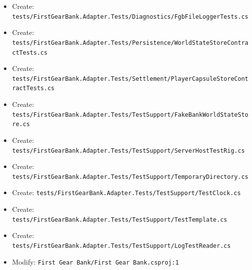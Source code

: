 \documentclass[
  10pt,
  letterpaper,
]{article}
\begin{document}
\begin{itemize}
\item
  Create:
  \texttt{tests/}\allowbreak{}\texttt{FirstGearBank.}\allowbreak{}\texttt{Adapter.}\allowbreak{}\texttt{Tests/}\allowbreak{}\texttt{Diagnostics/}\allowbreak{}\texttt{FgbFileLoggerTests.}\allowbreak{}\texttt{cs}
\item
  Create:
  \texttt{tests/}\allowbreak{}\texttt{FirstGearBank.}\allowbreak{}\texttt{Adapter.}\allowbreak{}\texttt{Tests/}\allowbreak{}\texttt{Persistence/}\allowbreak{}\texttt{WorldStateStoreContractTests.}\allowbreak{}\texttt{cs}
\item
  Create:
  \texttt{tests/}\allowbreak{}\texttt{FirstGearBank.}\allowbreak{}\texttt{Adapter.}\allowbreak{}\texttt{Tests/}\allowbreak{}\texttt{Settlement/}\allowbreak{}\texttt{PlayerCapsuleStoreContractTests.}\allowbreak{}\texttt{cs}
\item
  Create:
  \texttt{tests/}\allowbreak{}\texttt{FirstGearBank.}\allowbreak{}\texttt{Adapter.}\allowbreak{}\texttt{Tests/}\allowbreak{}\texttt{TestSupport/}\allowbreak{}\texttt{FakeBankWorldStateStore.}\allowbreak{}\texttt{cs}
\item
  Create:
  \texttt{tests/}\allowbreak{}\texttt{FirstGearBank.}\allowbreak{}\texttt{Adapter.}\allowbreak{}\texttt{Tests/}\allowbreak{}\texttt{TestSupport/}\allowbreak{}\texttt{ServerHostTestRig.}\allowbreak{}\texttt{cs}
\item
  Create:
  \texttt{tests/}\allowbreak{}\texttt{FirstGearBank.}\allowbreak{}\texttt{Adapter.}\allowbreak{}\texttt{Tests/}\allowbreak{}\texttt{TestSupport/}\allowbreak{}\texttt{TemporaryDirectory.}\allowbreak{}\texttt{cs}
\item
  Create:
  \texttt{tests/}\allowbreak{}\texttt{FirstGearBank.}\allowbreak{}\texttt{Adapter.}\allowbreak{}\texttt{Tests/}\allowbreak{}\texttt{TestSupport/}\allowbreak{}\texttt{TestClock.}\allowbreak{}\texttt{cs}
\item
  Create:
  \texttt{tests/}\allowbreak{}\texttt{FirstGearBank.}\allowbreak{}\texttt{Adapter.}\allowbreak{}\texttt{Tests/}\allowbreak{}\texttt{TestSupport/}\allowbreak{}\texttt{TestTemplate.}\allowbreak{}\texttt{cs}
\item
  Create:
  \texttt{tests/}\allowbreak{}\texttt{FirstGearBank.}\allowbreak{}\texttt{Adapter.}\allowbreak{}\texttt{Tests/}\allowbreak{}\texttt{TestSupport/}\allowbreak{}\texttt{LogTestReader.}\allowbreak{}\texttt{cs}
\item
  Modify:
  \texttt{First\ }\allowbreak{}\texttt{Gear\ }\allowbreak{}\texttt{Bank/}\allowbreak{}\texttt{First\ }\allowbreak{}\texttt{Gear\ }\allowbreak{}\texttt{Bank.}\allowbreak{}\texttt{csproj:}\allowbreak{}\texttt{1}

\end{itemize}
\end{document}
